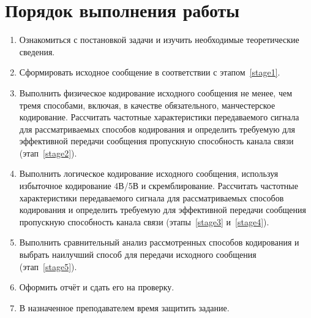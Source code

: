 \section{Порядок выполнения работы}
\begin{enumerate}
    \item \label{stage1} Ознакомиться с постановкой задачи и изучить необходимые теоретические сведения.
    \item \label{stage2} Сформировать исходное сообщение в соответствии с этапом~\ref{stage1}.
    \item \label{stage3} Выполнить физическое кодирование исходного сообщения не менее, чем тремя способами, включая,
    в качестве обязательного, манчестерское кодирование.
    Рассчитать частотные характеристики передаваемого сигнала для рассматриваемых способов кодирования и определить
    требуемую для эффективной передачи сообщения пропускную способность канала связи (этап~\ref{stage2}).
    \item \label{stage4} Выполнить логическое кодирование исходного сообщения, используя избыточное кодирование 4В/5В и скремблирование.
    Рассчитать частотные характеристики передаваемого сигнала для рассматриваемых способов кодирования и определить
    требуемую для эффективной передачи сообщения пропускную способность канала связи (этапы~\ref{stage3} и~\ref{stage4}).
    \item \label{stage5} Выполнить сравнительный анализ рассмотренных способов кодирования и выбрать наилучший способ для передачи исходного
    сообщения (этап~\ref{stage5}).
    \item \label{stage6} Оформить отчёт и сдать его на проверку.
    \item \label{stage7} В назначенное преподавателем время защитить задание.
\end{enumerate}
